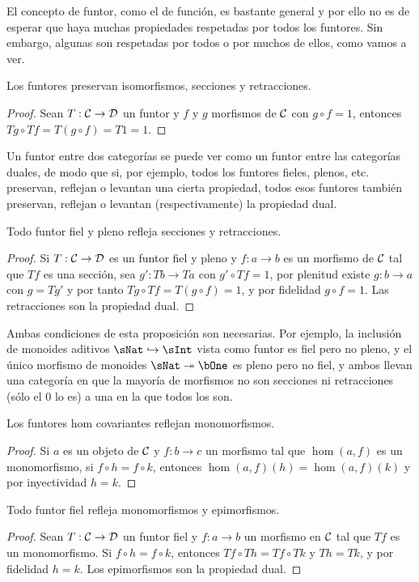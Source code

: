 El concepto de funtor, como el de función, es bastante general y por ello no es
de esperar que haya muchas propiedades respetadas por todos los funtores. Sin
embargo, algunas son respetadas por todos o por muchos de ellos, como vamos a
ver.

\begin{proposition}
  Los funtores preservan isomorfismos, secciones y retracciones.
\end{proposition}
\begin{proof}
  Sean $T:\mathcal{C}\to\mathcal{D}$ un funtor y $f$ y $g$ morfismos de $\mathcal{C}$ con $g\circ f=1$,
  entonces $Tg\circ Tf=T(g\circ f)=T1=1$.
\end{proof}

Un funtor entre dos categorías se puede ver como un funtor entre las categorías
duales, de modo que si, por ejemplo, todos los funtores fieles, plenos,
etc. preservan, reflejan o levantan una cierta propiedad, todos esos funtores
también preservan, reflejan o levantan (respectivamente) la propiedad dual.%

\begin{proposition}
  Todo funtor fiel y pleno refleja secciones y retracciones.
\end{proposition}
\begin{proof}
  Si $T:\mathcal{C}\to\mathcal{D}$ es un funtor fiel y pleno y $f:a\to b$ es un morfismo de
  $\mathcal{C}$ tal que $Tf$ es una sección, sea $g':Tb\to Ta$ con $g'\circ Tf=1$, por
  plenitud existe $g:b\to a$ con $g=Tg'$ y por tanto $Tg\circ Tf=T(g\circ f)=1$,
  y por fidelidad $g\circ f=1$. Las retracciones son la propiedad dual.
\end{proof}

Ambas condiciones de esta proposición son necesarias. Por ejemplo, la inclusión
de monoides aditivos $\sNat\inTo\sInt$ vista como funtor es fiel pero no pleno,
y el único morfismo de monoides $\sNat\epicTo\bOne$ es pleno pero no fiel, y
ambos llevan una categoría en que la mayoría de morfismos no son secciones ni
retracciones (sólo el 0 lo es) a una en la que todos los son.

\begin{proposition}
  Los funtores hom covariantes reflejan monomorfismos.
\end{proposition}
\begin{proof}
  Si $a$ es un objeto de $\mathcal{C}$ y $f:b\to c$ un morfismo tal que $\hom(a,f)$ es
  un monomorfismo, si $f\circ h=f\circ k$, entonces $\hom(a,f)(h)=\hom(a,f)(k)$
  y por inyectividad $h=k$.
\end{proof}

\begin{proposition}
  Todo funtor fiel refleja monomorfismos y epimorfismos.
\end{proposition}
\begin{proof}
  Sean $T:\mathcal{C}\to\mathcal{D}$ un funtor fiel y $f:a\to b$ un morfismo en $\mathcal{C}$ tal que
  $Tf$ es un monomorfismo. Si $f\circ h=f\circ k$, entonces
  $Tf\circ Th=Tf\circ Tk$ y $Th=Tk$, y por fidelidad $h=k$. Los epimorfismos son
  la propiedad dual.
\end{proof}
